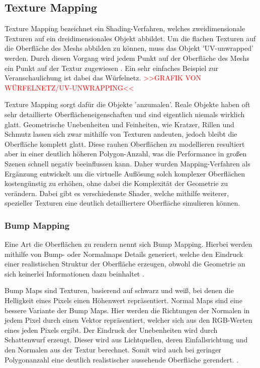 \subsection{Texture Mapping}

Texture Mapping bezeichnet ein Shading-Verfahren, welches zweidimensionale Texturen auf ein dreidimensionales Objekt
abbildet. Um die flachen Texturen auf die Oberfläche des Meshs abbilden zu können, muss das Objekt 'UV-unwrapped' werden.
Durch diesen Vorgang wird jedem Punkt auf der Oberfläche des Meshs ein Punkt auf der Textur zugewiesen \parencite{Catmull1974} \parencite{Blinn1976}.
Ein sehr einfaches Beispiel zur Veranschaulichung ist dabei das Würfelnetz.
\textcolor{red}{>>GRAFIK VON WÜRFELNETZ/UV-UNWRAPPING<<}

Texture Mapping sorgt dafür die Objekte 'anzumalen'.
Reale Objekte haben oft sehr detaillierte Oberflächeneigenschaften und sind eigentlich niemals wirklich glatt.
Geometrische Unebenheiten und Feinheiten, wie Kratzer, Rillen und Schmutz lassen sich zwar mithilfe von
Texturen andeuten, jedoch bleibt die Oberfläche komplett glatt. Diese rauhen Oberflächen zu modellieren resultiert
aber in einer deutlich höheren Polygon-Anzahl, was die Performance in großen Szenen schnell negativ beeinflussen kann.
Daher wurden Mapping-Verfahren als Ergänzung entwickelt um die virtuelle Auflösung
solch komplexer Oberflächen kostengünstig zu erhöhen, ohne dabei die Komplexität der Geometrie zu verändern.
Dabei gibt es verschiedenste Shader, welche mithilfe weiterer, spezieller Texturen eine deutlich detailliertere
Oberfläche simulieren können.


\subsubsection{Bump Mapping}

Eine Art die Oberflächen zu rendern nennt sich Bump Mapping.
Hierbei werden mithilfe von Bump- oder Normalmaps Details generiert, welche den Eindruck einer realistischen
Struktur der Oberfläche erzeugen, obwohl die Geometrie an sich keinerlei Informationen dazu beinhaltet \parencite{Blinn1978}.

Bump Maps sind Texturen, basierend auf schwarz und weiß, bei denen die Helligkeit eines Pixels einen Höhenwert
repräsentiert. Normal Maps sind eine bessere Variante der Bump Maps.
Hier werden die Richtungen der Normalen in jedem Pixel durch einen Vektor repräsentiert, welcher sich aus den
RGB-Werten eines jeden Pixels ergibt. 
Der Eindruck der Unebenheiten wird durch Schattenwurf erzeugt. Dieser wird aus Lichtquellen, 
deren Einfallsrichtung und den Normalen aus der Textur berechnet. Somit wird auch bei geringer Polygonanzahl eine
deutlich realistischer aussehende Oberfläche gerendert. 
\parencite{Cohen1998}.

